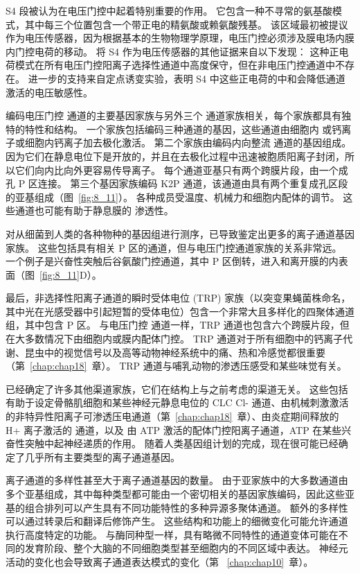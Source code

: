 S4 段被认为在电压门控中起着特别重要的作用。
它包含一种不寻常的氨基酸模式，其中每三个位置包含一个带正电的精氨酸或赖氨酸残基。
该区域最初被提议作为电压传感器，因为根据基本的生物物理学原理，电压门控必须涉及膜电场内膜内门控电荷的移动。
将 S4 作为电压传感器的其他证据来自以下发现：
这种正电荷模式在所有电压门控阳离子选择性通道中高度保守，但在非电压门控通道中不存在。
进一步的支持来自定点诱变实验，表明 S4 中这些正电荷的中和会降低通道激活的电压敏感性。


编码电压门控  通道的主要基因家族与另外三个  通道家族相关，每个家族都具有独特的特性和结构。
一个家族包括编码三种通道的基因，这些通道由细胞内  或钙离子或细胞内钙离子加去极化激活。
第二个家族由编码内向整流  通道的基因组成。
因为它们在静息电位下是开放的，并且在去极化过程中迅速被胞质阳离子封闭，所以它们向内比向外更容易传导离子。
每个通道亚基只有两个跨膜片段，由一个成孔 P 区连接。
第三个基因家族编码 K2P 通道，该通道由具有两个重复成孔区段的亚基组成（图~\ref{fig:8_11}）。
各种成员受温度、机械力和细胞内配体的调节。
这些通道也可能有助于静息膜的  渗透性。


对从细菌到人类的各种物种的基因组进行测序，已导致鉴定出更多的离子通道基因家族。
这些包括具有相关 P 区的通道，但与电压门控通道家族的关系非常远。
一个例子是兴奋性突触后谷氨酸门控通道，其中 P 区倒转，进入和离开膜的内表面（图~\ref{fig:8_11}D）。


最后，非选择性阳离子通道的瞬时受体电位 (TRP) 家族（以突变果蝇菌株命名，其中光在光感受器中引起短暂的受体电位）包含一个非常大且多样化的四聚体通道组，其中包含 P 区。
与电压门控  通道一样，TRP 通道也包含六个跨膜片段，但在大多数情况下由细胞内或膜内配体门控。
TRP 通道对于所有细胞中的钙离子代谢、昆虫中的视觉信号以及高等动物神经系统中的痛、热和冷感觉都很重要（第~\ref{chap:chap18}~章）。
TRP 通道与哺乳动物的渗透压感受和某些味觉有关。


已经确定了许多其他渠道家族，它们在结构上与之前考虑的渠道无关。
这些包括有助于设定骨骼肌细胞和某些神经元静息电位的 CLC Cl- 通道、由机械刺激激活的非特异性阳离子可渗透压电通道（第~\ref{chap:chap18}~章）、由炎症期间释放的 H+ 离子激活的  通道，以及 由 ATP 激活的配体门控阳离子通道，ATP 在某些兴奋性突触中起神经递质的作用。
随着人类基因组计划的完成，现在很可能已经确定了几乎所有主要类型的离子通道基因。


离子通道的多样性甚至大于离子通道基因的数量。
由于亚家族中的大多数通道由多个亚基组成，其中每种类型都可能由一个密切相关的基因家族编码，因此这些亚基的组合排列可以产生具有不同功能特性的多种异源多聚体通道。
额外的多样性可以通过转录后和翻译后修饰产生。
这些结构和功能上的细微变化可能允许通道执行高度特定的功能。
与酶同种型一样，具有略微不同特性的通道变体可能在不同的发育阶段、整个大脑的不同细胞类型甚至细胞内的不同区域中表达。
神经元活动的变化也会导致离子通道表达模式的变化（第 ~\ref{chap:chap10}~章）。


